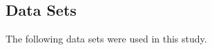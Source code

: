 \documentclass[sigconf,nonacm,11pt]{acmart}
\begin{document}




\appendix
\begin{appendix}

\section{Data Sets}
\label{appendix:datasets}
The following data sets were used in this study.




\end{appendix}
\end{document}
